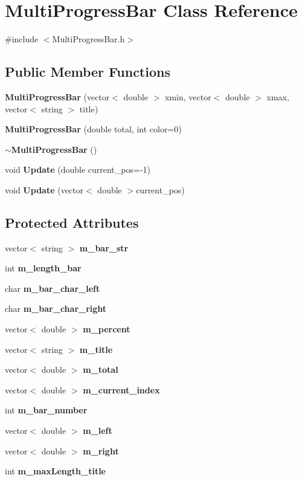 \section{Multi\+Progress\+Bar Class Reference}
\label{classMultiProgressBar}


{\ttfamily \#include $<$Multi\+Progress\+Bar.\+h$>$}

\subsection*{Public Member Functions}
\begin{DoxyCompactItemize}
\item 
\textbf{ Multi\+Progress\+Bar} (vector$<$ double $>$ xmin, vector$<$ double $>$ xmax, vector$<$ string $>$ title)
\item 
\textbf{ Multi\+Progress\+Bar} (double total, int color=0)
\item 
\textbf{ $\sim$\+Multi\+Progress\+Bar} ()
\item 
void \textbf{ Update} (double current\+\_\+pos=-\/1)
\item 
void \textbf{ Update} (vector$<$ double $>$current\+\_\+pos)
\end{DoxyCompactItemize}
\subsection*{Protected Attributes}
\begin{DoxyCompactItemize}
\item 
vector$<$ string $>$ \textbf{ m\+\_\+bar\+\_\+str}
\item 
int \textbf{ m\+\_\+length\+\_\+bar}
\item 
char \textbf{ m\+\_\+bar\+\_\+char\+\_\+left}
\item 
char \textbf{ m\+\_\+bar\+\_\+char\+\_\+right}
\item 
vector$<$ double $>$ \textbf{ m\+\_\+percent}
\item 
vector$<$ string $>$ \textbf{ m\+\_\+title}
\item 
vector$<$ double $>$ \textbf{ m\+\_\+total}
\item 
vector$<$ double $>$ \textbf{ m\+\_\+current\+\_\+index}
\item 
int \textbf{ m\+\_\+bar\+\_\+number}
\item 
vector$<$ double $>$ \textbf{ m\+\_\+left}
\item 
vector$<$ double $>$ \textbf{ m\+\_\+right}
\item 
int \textbf{ m\+\_\+max\+Length\+\_\+title}
\end{DoxyCompactItemize}
